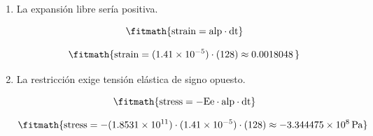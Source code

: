 \begin{enumerate}

\item La expansión libre sería positiva.

\[\fitmath{\mathrm{strain}=\mathrm{alp}\cdot \mathrm{dt}}\]

\[\fitmath{\mathrm{strain}=(1.41\times10^{-5})\cdot (128)\approx 0.0018048\,}\]

\item La restricción exige tensión elástica de signo opuesto.

\[\fitmath{\mathrm{stress}=-\mathrm{Ee}\cdot \mathrm{alp}\cdot \mathrm{dt}}\]

\[\fitmath{\mathrm{stress}=-(1.8531\times10^{11})\cdot (1.41\times10^{-5})\cdot (128)\approx -3.344475\times10^{8}\,\mathrm{Pa}}\]

\end{enumerate}
